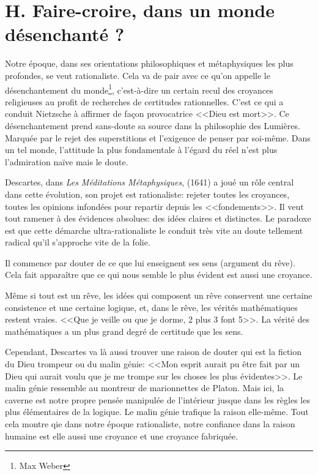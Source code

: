 \documentclass[12pt]{article}
\begin{document}
\section*{\color{red}H. Faire-croire, dans un monde désenchanté ?}
Notre époque, dans ses orientations philosophiques et métaphysiques les plus profondes, se veut rationaliste.
Cela va de pair avec ce qu'on appelle le désenchantement du monde\footnote{Max Weber}, c'est-à-dire un certain recul des croyances religieuses au profit de recherches de certitudes rationnelles.
C'est ce qui a conduit Nietzsche à affirmer de façon provocatrice <<Dieu est mort>>.
Ce désenchantement prend sans-doute sa source dans la philosophie des Lumières.
Marquée par le rejet des superstitions et l'exigence de penser par soi-même.
Dans un tel monde, l'attitude la plus fondamentale à l'égard du réel n'est plus l'admiration naïve mais le doute.\par
Descartes, dans \emph{Les Méditations Métaphysiques}, (1641) a joué un rôle central dans cette évolution, son projet est rationaliste: rejeter toutes les croyances, toutes les opinions infondées pour repartir depuis les <<fondements>>.
Il veut tout ramener à des évidences absolues: des idées claires et distinctes.
Le paradoxe est que cette démarche ultra-rationaliste le conduit très vite au doute tellement radical qu'il s'approche vite de la folie.\par
Il commence par douter de ce que lui enseignent ses sens (argument du rêve). Cela fait apparaître que ce qui nous semble le plus évident est aussi une croyance.\par
Même si tout est un rêve, les idées qui composent un rêve conservent une certaine consistence et une certaine logique, et, dans le rêve, les vérités mathématiques restent vraies.
<<Que je veille ou que je dorme, 2 plus 3 font 5>>.
La vérité des mathématiques a un plus grand degré de certitude que les sens.\par
Cependant, Descartes va là aussi trouver une raison de douter qui est la fiction du Dieu trompeur ou du malin génie: <<Mon esprit aurait pu être fait par un Dieu qui aurait voulu que je me trompe sur les choses les plus évidentes>>.
Le malin génie ressemble au montreur de marionnettes de Platon.
Mais ici, la caverne est notre propre pensée manipulée de l'intérieur jusque dans les règles les plus élémentaires de la logique.
Le malin génie trafique la raison elle-même.
Tout cela montre qie dans notre époque rationaliste, notre confiance dans la raison humaine est elle aussi une croyance et une croyance fabriquée.\par
\end{document}
